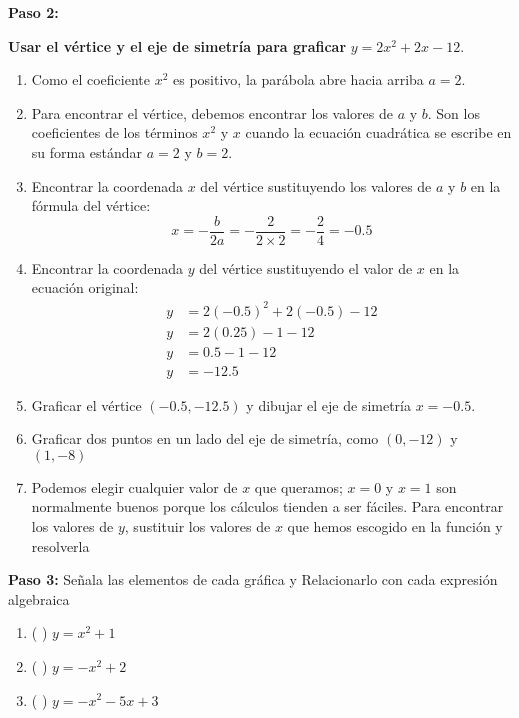 \documentclass[12pt,a4paper]{article}
\begin{document}
\vspace{1cm}

\textbf{Paso 2:}

\textbf{Usar el vértice y el eje de simetría para graficar} $y = 2x^2 + 2x - 12$.

\begin{enumerate}
\item Como el coeficiente $x^2$ es positivo, la parábola abre hacia arriba $a = 2$.
\item Para encontrar el vértice, debemos encontrar los valores de $a$ y $b$. Son los coeficientes de los términos $x^2$ y $x$ cuando la ecuación cuadrática se escribe en su forma estándar $a = 2$ y $b = 2$.
\item Encontrar la coordenada $x$ del vértice sustituyendo los valores de $a$ y $b$ en la fórmula del vértice:
$$x = -\frac{b}{2a} = -\frac{2}{2 \times 2} = -\frac{2}{4} = -0.5$$
\item Encontrar la coordenada $y$ del vértice sustituyendo el valor de $x$ en la ecuación original:
\begin{align*}
y &= 2(-0.5)^2 + 2(-0.5) - 12 \\
y &= 2(0.25) - 1 - 12 \\
y &= 0.5 - 1 - 12 \\
y &= -12.5
\end{align*}
\item Graficar el vértice $(-0.5, -12.5)$ y dibujar el eje de simetría $x = -0.5$.
\item Graficar dos puntos en un lado del eje de simetría, como $(0, -12)$ y $(1, -8)$
\item Podemos elegir cualquier valor de $x$ que queramos; $x = 0$ y $x = 1$ son normalmente buenos porque los cálculos tienden a ser fáciles. Para encontrar los valores de $y$, sustituir los valores de $x$ que hemos escogido en la función y resolverla
\end{enumerate}

\vspace{5mm}


\textbf{Paso 3:} Señala las elementos de cada gráfica y Relacionarlo con cada expresión algebraica

\begin{enumerate}[label=\alph*.]
\item ( \quad ) $y = x^2 + 1$
\item ( \quad ) $y = -x^2 + 2$
\item ( \quad ) $y = -x^2 - 5x + 3$
\end{enumerate}
\end{document}
